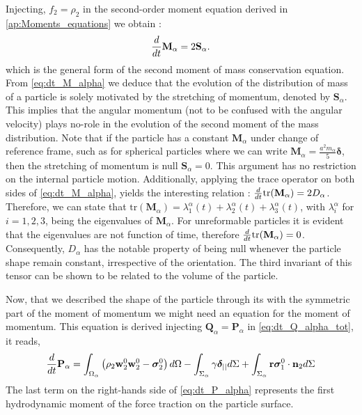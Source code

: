 Injecting, $f_2 = \rho_2$ in the second-order moment equation derived in \ref{ap:Moments_equations} we obtain :
\begin{equation}
    \frac{d}{d t} {\textbf{M}_\alpha}=2\textbf{S}_\alpha. 
    \label{eq:dt_M_alpha}
\end{equation}
which is the general form of the second moment of mass conservation equation. 
From \ref{eq:dt_M_alpha} we deduce that the evolution of the distribution of mass of a particle is solely motivated by the stretching of momentum, denoted by $\textbf{S}_\alpha$. 
This implies that the angular momentum (not to be confused with the angular velocity) plays no-role in the evolution of the second moment of the mass distribution. 
Note that if the particle has a constant $\textbf{M}_\alpha$ under change of reference frame, such as for spherical particles where we can write $\textbf{M}_\alpha= \frac{a^2 m_\alpha}{5} \bm\delta$, then the stretching of momentum is null $\textbf{S}_\alpha=0$.
This argument has no restriction on the internal particle motion. 
Additionally, applying the trace operator on both sides of \ref{eq:dt_M_alpha}, yields the interesting relation : $\frac{d}{d t} {\text{tr}(\textbf{M}_\alpha)}=2D_\alpha$.
Therefore, we can state that $\text{tr}(\textbf{M}_\alpha) = \lambda^\alpha_1(t)+\lambda^\alpha_2(t)+\lambda^\alpha_3(t)$, with $\lambda_i^\alpha$ for $i=1,2,3$, being the eigenvalues of $\textbf{M}_\alpha$.
For unreformable particles it is evident that the eigenvalues are not function of time, therefore $\frac{d}{d t}{ \text{tr}(\textbf{M}_\alpha)}=0$.  
Consequently, $D_\alpha$ has the notable property of being null whenever the particle shape remain constant, irrespective of the orientation.
The third invariant of this tensor can be shown to be related to the volume of the particle. 

Now, that we described the shape of the particle through its with the symmetric part of the moment of momentum we might need an equation for the moment of momentum. 
This equation is derived injecting $\textbf{Q}_\alpha = \textbf{P}_\alpha$ in \ref{eq:dt_Q_alpha_tot}, it reads, 
\begin{equation}
    \frac{d}{d t} {\textbf{P}_\alpha}
    = \int_{\Omega_\alpha}  \left(
        \rho_2  \textbf{w}_2^0 \textbf{w}_2^0 
        - \bm{\sigma}_2^0
    \right)  d\Omega
    - \int_{\Sigma_\alpha}  
        \gamma \bm\delta_{||}
     d\Sigma
    + \int_{\Sigma_\alpha}  \textbf{r}\bm{\sigma}_1^0\cdot \textbf{n}_2 d\Sigma 
    \label{eq:dt_P_alpha}
\end{equation}
The last term on the right-hands side of \ref{eq:dt_P_alpha} represents the first hydrodynamic moment of the force traction on the particle surface.

